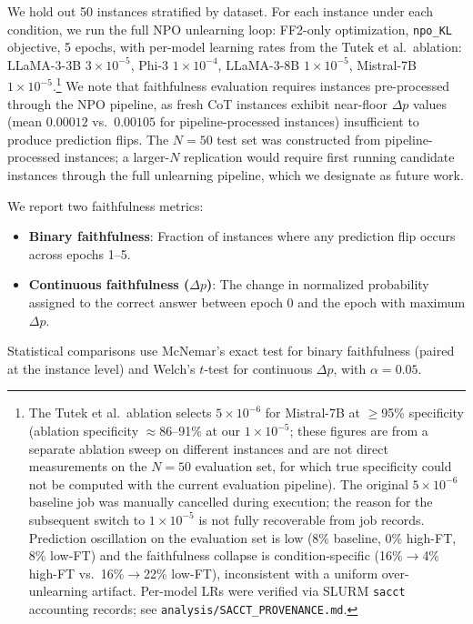 \documentclass[11pt]{article}
\begin{document}
We hold out 50 instances stratified by dataset. For each instance under each
condition, we run the full NPO unlearning loop: FF2-only optimization,
\texttt{npo\_KL} objective, 5 epochs, with per-model learning rates from
the Tutek et al.\ ablation:
LLaMA-3-3B $3 \times 10^{-5}$, Phi-3 $1 \times 10^{-4}$,
LLaMA-3-8B $1 \times 10^{-5}$, Mistral-7B $1 \times 10^{-5}$.\footnote{%
  The Tutek et al.\ ablation selects $5 \times 10^{-6}$ for Mistral-7B
  at $\geq$95\% specificity (ablation specificity $\approx$86--91\%
  at our $1 \times 10^{-5}$; these figures are from a separate ablation
  sweep on different instances and are not direct measurements on the
  $N{=}50$ evaluation set, for which true specificity could not be
  computed with the current evaluation pipeline).
  The original $5 \times 10^{-6}$ baseline job was manually cancelled
  during execution; the reason for the subsequent switch to
  $1 \times 10^{-5}$ is not fully recoverable from job records.
  Prediction oscillation on the evaluation set is low
  (8\% baseline, 0\% high-FT, 8\% low-FT) and the faithfulness collapse
  is condition-specific (16\%$\to$4\% high-FT vs.\ 16\%$\to$22\% low-FT),
  inconsistent with a uniform over-unlearning artifact.
  Per-model LRs were verified via SLURM \texttt{sacct} accounting records;
  see \texttt{analysis/SACCT\_PROVENANCE.md}.}
We note that faithfulness evaluation requires instances pre-processed through
the NPO pipeline, as fresh CoT instances exhibit near-floor $\Delta p$ values
(mean $0.00012$ vs.\ $0.00105$ for pipeline-processed instances) insufficient
to produce prediction flips. The $N{=}50$ test set was constructed from
pipeline-processed instances; a larger-$N$ replication would require first
running candidate instances through the full unlearning pipeline, which we
designate as future work.

We report two faithfulness metrics:
\begin{itemize}
  \item \textbf{Binary faithfulness}: Fraction of instances where any
        prediction flip occurs across epochs 1--5.
  \item \textbf{Continuous faithfulness ($\Delta p$)}: The change in
        normalized probability assigned to the correct answer between epoch 0
        and the epoch with maximum $\Delta p$.
\end{itemize}

Statistical comparisons use McNemar's exact test for binary faithfulness
(paired at the instance level) and Welch's $t$-test for continuous $\Delta p$,
with $\alpha = 0.05$.
\end{document}
